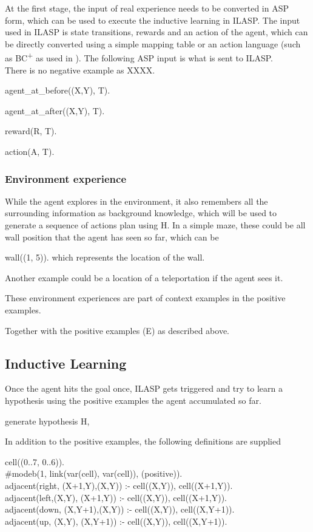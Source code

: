 At the first stage, the input of real experience needs to be converted in ASP form, which can be used to execute the inductive learning in ILASP. The input used in ILASP is state transitions, 
rewards and an action of the agent, which can be directly converted using a simple mapping table or an action language (such as BC\textsuperscript{+} as used in \cite{Ferreira2017}). 
The following ASP input is what is sent to ILASP. \\

There is no negative example as XXXX. 

agent\_at\_before((X,Y), T).

agent\_at\_after((X,Y), T).

reward(R, T).

action(A, T).

\subsubsection{Environment experience}

While the agent explores in the environment, it also remembers all the surrounding information as background knowledge, 
which will be used to generate a sequence of actions plan using H. In a simple maze, these could be all wall position that the agent has seen so far, which can be 

wall((1, 5)). which represents the location of the wall. 

Another example could be a location of a teleportation if the agent sees it. 

These environment experiences are part of context examples in the positive examples. 

Together with the positive examples (E) as described above. 

\subsection{Inductive Learning}
\label{induction}

Once the agent hits the goal once, ILASP gets triggered and try to learn a hypothesis using the positive examples the agent accumulated so far. 

generate hypothesis H,

In addition to the positive examples, the following definitions are supplied

cell((0..7, 0..6)). \\
\#modeb(1, link(var(cell), var(cell)), (positive)). \\
adjacent(right, (X+1,Y),(X,Y))   :- cell((X,Y)), cell((X+1,Y)). \\
adjacent(left,(X,Y),  (X+1,Y)) :- cell((X,Y)), cell((X+1,Y)). \\
adjacent(down, (X,Y+1),(X,Y))   :- cell((X,Y)), cell((X,Y+1)). \\
adjacent(up,   (X,Y),  (X,Y+1)) :- cell((X,Y)), cell((X,Y+1)). \\

